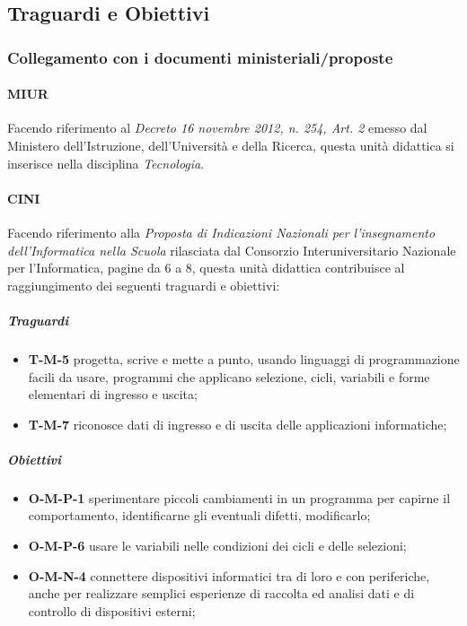 \documentclass[../../relazione.tex]{subfiles}
\begin{document}
\subsection{Traguardi e Obiettivi}

\subsubsection{Collegamento con i documenti ministeriali/proposte}
\paragraph{MIUR}
Facendo riferimento al \textit{Decreto 16 novembre 2012, n. 254, Art. 2} \cite{MIURWeb, MIUR254} emesso dal Ministero dell'Istruzione, dell'Università e della Ricerca, questa unità didattica si inserisce nella disciplina \textit{Tecnologia}.

\paragraph{CINI}
Facendo riferimento alla \textit{Proposta di Indicazioni Nazionali per l'insegnamento dell'Informatica nella Scuola} \cite{CINI} rilasciata dal Consorzio Interuniversitario Nazionale per l'Informatica, pagine da 6 a 8, questa unità didattica contribuisce al raggiungimento dei seguenti traguardi e obiettivi:
\subparagraph{Traguardi}
\begin{itemize}
	\item \textbf{T-M-5} progetta, scrive e mette a punto, usando linguaggi di programmazione facili da usare, programmi che applicano selezione, cicli, variabili e forme elementari di ingresso e uscita;
	\item \textbf{T-M-7} riconosce dati di ingresso e di uscita delle applicazioni informatiche;
\end{itemize}
\subparagraph{Obiettivi}
\begin{itemize}
	\item \textbf{O-M-P-1} sperimentare piccoli cambiamenti in un programma per capirne il comportamento, identificarne gli eventuali difetti, modificarlo;
	\item \textbf{O-M-P-6} usare le variabili nelle condizioni dei cicli e delle selezioni;
	\item \textbf{O-M-N-4} connettere dispositivi informatici tra di loro e con periferiche, anche per realizzare semplici esperienze di raccolta ed analisi dati e di controllo di dispositivi esterni;
\end{itemize}
\end{document}
